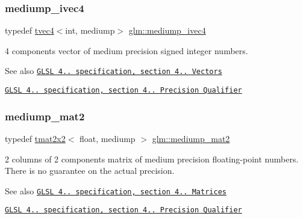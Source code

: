 \subsubsection{\texorpdfstring{mediump\+\_\+ivec4}{mediump\_ivec4}}
{\footnotesize\ttfamily typedef \hyperlink{structglm_1_1tvec4}{tvec4}$<$int, mediump$>$ \hyperlink{group__core__precision_ga687eefa63b2c9d0969227eaf23b1ad41}{glm\+::mediump\+\_\+ivec4}}

4 components vector of medium precision signed integer numbers.

\begin{DoxySeeAlso}{See also}
\href{http://www.opengl.org/registry/doc/GLSLangSpec.4.20.8.pdf}{\tt G\+L\+SL 4.. specification, section 4.. Vectors} 

\href{http://www.opengl.org/registry/doc/GLSLangSpec.4.20.8.pdf}{\tt G\+L\+SL 4.. specification, section 4.. Precision Qualifier} 
\end{DoxySeeAlso}
\mbox{\label{group__core__precision_ga3b83486a767447bf1b36bbf32e589bac}} 
\subsubsection{\texorpdfstring{mediump\+\_\+mat2}{mediump\_mat2}}
{\footnotesize\ttfamily typedef \hyperlink{structglm_1_1tmat2x2}{tmat2x2}$<$ float, mediump $>$ \hyperlink{group__core__precision_ga3b83486a767447bf1b36bbf32e589bac}{glm\+::mediump\+\_\+mat2}}

2 columns of 2 components matrix of medium precision floating-\/point numbers. There is no guarantee on the actual precision.

\begin{DoxySeeAlso}{See also}
\href{http://www.opengl.org/registry/doc/GLSLangSpec.4.20.8.pdf}{\tt G\+L\+SL 4.. specification, section 4.. Matrices} 

\href{http://www.opengl.org/registry/doc/GLSLangSpec.4.20.8.pdf}{\tt G\+L\+SL 4.. specification, section 4.. Precision Qualifier} 
\end{DoxySeeAlso}
\mbox{\label{group__core__precision_ga7f27d5d720010e94d8a98eaaaf7f1f32}} 
